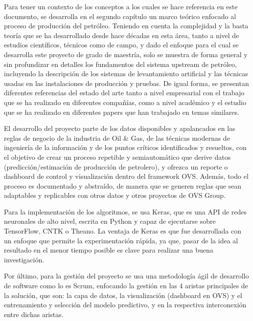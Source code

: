 Para tener un contexto de los conceptos a los cuales se hace referencia en este
documento, se desarrolla en el segundo capítulo un marco teórico enfocado al
proceso de producción del petróleo.  Teniendo en cuenta la complejidad y la
basta teoría que se ha desarrollado desde hace décadas en esta área, tanto a
nivel de estudios científicos, técnicos como de campo, y dado el enfoque para
el cual se desarrolla este proyecto de grado de maestría, solo se muestra de
forma general y sin profundizar en detalles los fundamentos del sistema
upstream de petróleo, incluyendo la descripción de los sistemas de
levantamiento artificial y las técnicas usadas en las instalaciones de
producción y pruebas. De igual forma, se presentan diferentes referencias del
estado del arte tanto a nivel empresarial con el trabajo que se ha realizado en
diferentes compañías, como a nivel académico y el estudio que se ha realizado
en diferentes papers que han trabajado en temas similares.

El desarrollo del proyecto parte de los datos disponibles y apalancados en las
reglas de negocio de la industria de Oil \& Gas, de las técnicas modernas de
ingeniería de la información y de los puntos críticos identificados y
resueltos, con el objetivo de crear un proceso repetible y semiautomático que
derive datos (predicción/estimación de producción de petrolero), y ofrezca un
reporte o dashboard de control y visualización dentro del framework OVS.
Además, todo el proceso es documentado y abstraído, de manera que se generen
reglas que sean adaptables y replicables con otros datos y otros proyectos de
OVS Group.

Para la implementación de los algoritmos, se usa Keras, que es una API de redes
neuronales de alto nivel, escrita en Python y capaz de ejecutarse sobre
TensorFlow, CNTK o Theano. La ventaja de Keras es que fue desarrollada con un
enfoque que permite la experimentación rápida, ya que, pasar de la idea al
resultado en el menor tiempo posible es clave para realizar una buena
investigación.

Por último, para la gestión del proyecto se usa una metodología ágil de
desarrollo de software como lo es Scrum, enfocando la gestión en las 4 aristas
principales de la solución, que son: la capa de datos, la visualización
(dashboard en OVS) y el entrenamiento y selección del modelo predictivo, y en
la respectiva interconexión entre dichas aristas.
